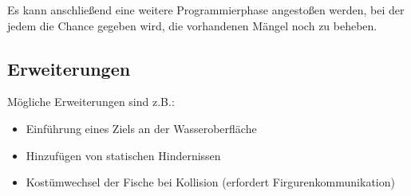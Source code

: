 Es kann anschließend eine weitere Programmierphase angestoßen werden,
bei der jedem die Chance gegeben wird, die vorhandenen Mängel noch zu
beheben.

\subsection{Erweiterungen}\label{erweiterungen}

Mögliche Erweiterungen sind z.B.:

\begin{itemize}
\item
  Einführung eines Ziels an der Wasseroberfläche
\item
  Hinzufügen von statischen Hindernissen
\item
  Kostümwechsel der Fische bei Kollision (erfordert
  Firgurenkommunikation)
\end{itemize}
